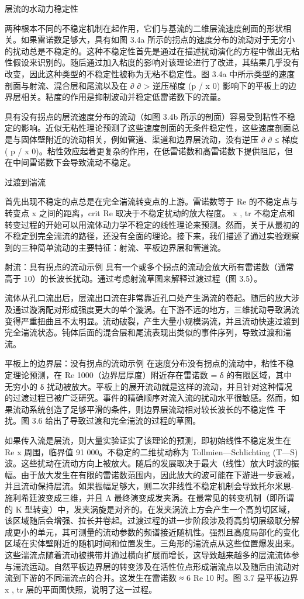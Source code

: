 \documentclass[11pt,a4paper,openany,fontset=none]{ctexbook}
\begin{document}
层流的水动力稳定性

两种根本不同的不稳定机制在起作用，它们与基流的二维层流速度剖面的形状相关。如果雷诺数足够大，具有如图 3.4a 所示的拐点的速度分布的流动对于无穷小的扰动总是不稳定的。这种不稳定性首先是通过在描述扰动演化的方程中做出无粘性假设来识别的。随后通过加入粘度的影响对该理论进行了改进，其结果几乎没有改变，因此这种类型的不稳定性被称为无粘不稳定性。图 3.4a 中所示类型的速度剖面与射流、混合层和尾流以及在 ∂ ∂ > 逆压梯度 (p / x 0) 影响下的平板上的边界层相关。粘度的作用是抑制波动并稳定低雷诺数下的流量。

具有没有拐点的层流速度分布的流动（如图 3.4b 所示的剖面）容易受到粘性不稳定的影响。近似无粘性理论预测了这些速度剖面的无条件稳定性，这些速度剖面总是与固体壁附近的流动相关，例如管道、渠道和边界层流动，没有逆压 ∂ ∂ ≤ 梯度 ( p / x 0)。粘性效应起着更复杂的作用，在低雷诺数和高雷诺数下提供阻尼，但在中间雷诺数下会导致流动不稳定。

过渡到湍流

首先出现不稳定的点总是在完全湍流转变点的上游。雷诺数等于 Re 的不稳定点与转变点 x 之间的距离，crit
Re 取决于不稳定扰动的放大程度。 x , tr 不稳定点和转变过程的开始可以用流体动力学不稳定的线性理论来预测。然而，关于从最初的不稳定到完全湍流的路径，还没有全面的理论。接下来，我们描述了通过实验观察到的三种简单流动的主要特征：射流、平板边界层和管道流。

射流：具有拐点的流动示例
具有一个或多个拐点的流动会放大所有雷诺数（通常高于 10）的长波长扰动。通过考虑射流草图来解释过渡过程（图 3.5）。

流体从孔口流出后，层流出口流在非常靠近孔口处产生涡流的卷起。随后的放大涉及通过漩涡配对形成强度更大的单个漩涡。在下游不远的地方，三维扰动导致涡流变得严重扭曲且不太明显。流动破裂，产生大量小规模涡流，并且流动快速过渡到完全湍流状态。钝体后面的混合层和尾流表现出类似的事件序列，导致过渡和湍流。

平板上的边界层：没有拐点的流动示例
在速度分布没有拐点的流动中，粘性不稳定理论预测，在 Re 1000（边界层厚度）附近存在雷诺数 = δ 的有限区域，其中无穷小的 δ 扰动被放大。平板上的展开流动就是这样的流动，并且针对这种情况的过渡过程已被广泛研究。事件的精确顺序对流入流的扰动水平很敏感。然而，如果流动系统创造了足够平滑的条件，则边界层流动相对较长波长的不稳定性
干扰。图 3.6 给出了导致过渡和完全湍流的过程的草图。

如果传入流是层流，则大量实验证实了该理论的预测，即初始线性不稳定发生在 Re x 周围，临界值 91 000。不稳定的二维扰动称为 Tollmien—Schlichting (T—S) 波。这些扰动在流动方向上被放大。随后的发展取决于最大（线性）放大时波的振幅。由于放大发生在有限的雷诺数范围内，因此放大的波可能在下游进一步衰减，并且流动保持层流。如果振幅足够大，则二次非线性不稳定机制会导致托尔米恩-施利希廷波变成三维，并且 Λ 最终演变成发夹涡。在最常见的转变机制（即所谓的 K 型转变）中，发夹涡旋是对齐的。在发夹涡流上方会产生一个高剪切区域，该区域随后会增强、拉长并卷起。过渡过程的进一步阶段涉及将高剪切层级联分解成更小的单元，其可测量的流动参数的频谱接近随机性。强烈且高度局部化的变化区域在实体壁附近的随机时间和位置发生。三角形的湍流点从这些位置爆发出来。这些湍流点随着流动被携带并通过横向扩展而增长，这导致越来越多的层流流体参与湍流运动。自然平板边界层的转变涉及在活性位点形成湍流点以及随后由流动对流到下游的不同湍流点的合并。这发生在雷诺数 ≈ 6 Re 10 时。图 3.7 是平板边界 x , tr 层的平面图快照，说明了这一过程。
\end{document}

